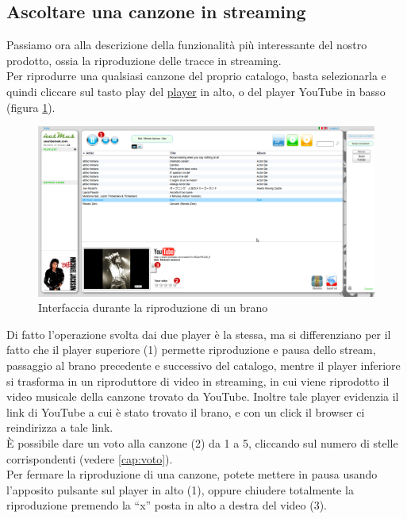 \subsection{Ascoltare una canzone in streaming}

Passiamo ora alla descrizione della funzionalit\`a pi\`u
interessante del nostro prodotto, ossia la riproduzione delle tracce in streaming.\\
Per riprodurre una qualsiasi canzone del proprio catalogo, basta selezionarla e
quindi cliccare sul tasto play del \underline{player} in alto, o del player
YouTube in basso (figura \ref{fig:play}).\\ 
\begin{figure}[!htbp]
  \centering
  \includegraphics[width=14cm]{img/MU/player_youtube.png}
\caption{Interfaccia durante la riproduzione di un brano}
\label{fig:play}
\end{figure} 

Di fatto l'operazione svolta dai due player \`e la stessa, ma
si differenziano per il fatto che il player superiore (1) permette riproduzione
e pausa dello stream, passaggio al brano precedente e successivo del catalogo, mentre il player
inferiore si trasforma in un riproduttore di video in streaming, in cui viene
riprodotto il video musicale della canzone trovato da YouTube.
Inoltre tale player evidenzia il link di YouTube a cui \`e stato trovato il
brano, e con un click il browser ci reindirizza a tale link.\\
\`E possibile dare un voto alla canzone (2) da 1 a 5, cliccando sul numero di
stelle corrispondenti (vedere \ref{cap:voto}).\\

Per fermare la riproduzione di una canzone, potete mettere in pausa usando
l'apposito pulsante sul player in alto (1), oppure chiudere totalmente la
riproduzione premendo la ``x'' posta in alto a destra del video (3).\\

